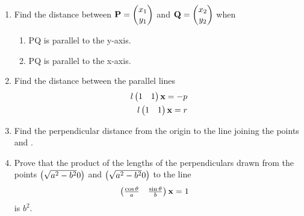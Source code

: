 \documentclass[journal,12pt,twocolumn]{IEEEtran}
\renewcommand\thesection{\arabic{section}}
\begin{document}
\begin{enumerate}[label=\thesection.\arabic*.,ref=\thesection.\theenumi]
\item Find the distance between $\mathbf{P}= \begin{pmatrix}x_1  \\ y_1\end{pmatrix}$ and $\mathbf{Q} =\begin{pmatrix}x_2 \\ y_2\end{pmatrix}$ when
\begin{enumerate}
\item PQ is parallel to the y-axis.
\item PQ is parallel to the x-axis.
\end{enumerate}
\item Find the distance between the parallel lines
%
\begin{align}
l\begin{pmatrix}1 & 1\end{pmatrix}\mathbf{x} = -p
\\
l\begin{pmatrix}1 & 1\end{pmatrix}\mathbf{x} = r
\end{align}
%
\item Find the perpendicular distance from the origin to the line joining the points \myvec{\cos\theta \\ \sin  \theta} and \myvec{\cos\phi \\ \sin \phi}.
\item Prove that the product of the lengths of the perpendiculars drawn from the points $\begin{pmatrix}\sqrt{a^2-b^2}0\end{pmatrix}$ and $\begin{pmatrix}\sqrt{a^2-b^2}0\end{pmatrix}$ to the line 
%
\begin{align}
\begin{pmatrix}\frac{\cos\theta}{a} & \frac{\sin\theta}{b}\end{pmatrix}\mathbf{x} &= 1
\end{align}
%
is $b^2$.



\end{enumerate}
\end{document}
